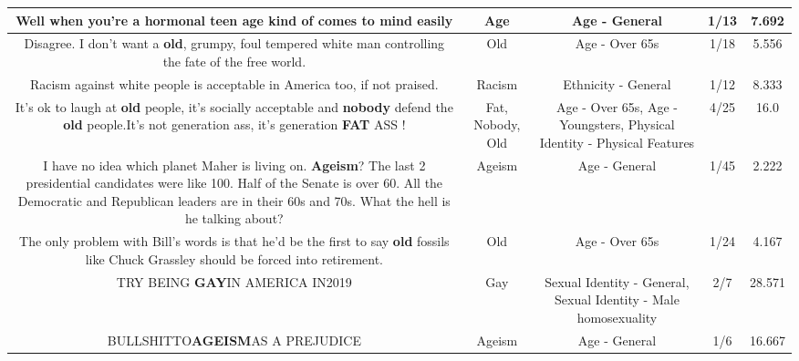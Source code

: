 \documentclass[11pt]{article}
\newlength\mylength
\begin{document}
\begin{center}
\begin{longtable}{|C{.65\mylength}|C{.30\mylength}|C{.12\mylength}|C{.12\mylength}|C{.12\mylength}|}
  \small Well when you're a hormonal teen \textbf{age} kind of comes to mind easily\normalsize   & Age & Age - General & 1/13 & 7.692 \\  \hline
  \small Disagree. I don't want a \textbf{old}, grumpy, foul tempered white man controlling the fate of the free world.\normalsize   & Old & Age - Over 65s & 1/18 & 5.556 \\  \hline
  \small Racism against white people is acceptable in America too, if not praised.\normalsize   & Racism & Ethnicity - General & 1/12 & 8.333 \\  \hline
  \small It's ok to laugh at \textbf{old} people, it's socially acceptable and \textbf{nobody} defend the \textbf{old} people.It's not generation ass, it's generation \textbf{FAT} ASS !\normalsize   & Fat, Nobody, Old & Age - Over 65s, Age - Youngsters, Physical Identity - Physical Features & 4/25 & 16.0 \\  \hline
  \small I have no idea which planet Maher is living on. \textbf{Ageism}? The last 2 presidential candidates were like 100. Half of the Senate is over 60. All the Democratic and Republican leaders are in their 60s and 70s. What the hell is he talking about?\normalsize   & Ageism & Age - General & 1/45 & 2.222 \\  \hline
  \small The only problem with Bill's words is that he'd be the first to say \textbf{old} fossils like Chuck Grassley should be forced into retirement.\normalsize   & Old & Age - Over 65s & 1/24 & 4.167 \\  \hline
  \small TRY BEING \textbf{G\textbf{AY}}IN AMERICA IN2019\normalsize   & Gay & Sexual Identity - General, Sexual Identity - Male homosexuality & 2/7 & 28.571 \\  \hline
  \small BULLSHITTO\textbf{AGEISM}AS A PREJUDICE\normalsize   & Ageism & Age - General & 1/6 & 16.667 \\  \hline

\end{longtable}
\end{center}
\end{document}
